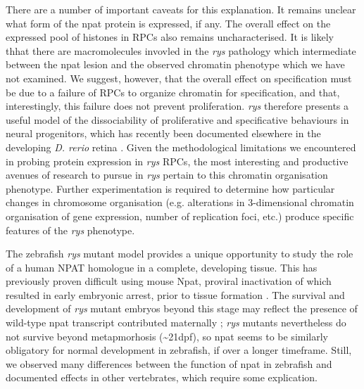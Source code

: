 \documentclass{ut-thesis}
\begin{document}
\begin{NoHyper}
There are a number of important caveats for this explanation. It remains unclear what form of the npat protein is expressed, if any. The overall effect on the expressed pool of histones in RPCs also remains uncharacterised. It is likely thhat there are macromolecules invovled in the \textit{rys} pathology which intermediate between the npat lesion and the observed chromatin phenotype which we have not examined. We suggest, however, that the overall effect on specification must be due to a failure of RPCs to organize chromatin for specification, and that, interestingly, this failure does not prevent proliferation. \textit{rys} therefore presents a useful model of the dissociability of proliferative and specificative behaviours in neural progenitors, which has recently been documented elsewhere in the developing \textit{D. rerio} retina \cite{Engerer2017}. Given the methodological limitations we encountered in probing protein expression in \textit{rys} RPCs, the most interesting and productive avenues of research to pursue in \textit{rys} pertain to this chromatin organisation phenotype.  Further experimentation is required to determine how particular changes in chromosome organisation (e.g. alterations in 3-dimensional chromatin organisation of gene expression, number of replication foci, etc.) produce specific features of the \textit{rys} phenotype. 

The zebrafish \textit{rys} mutant model provides a unique opportunity to study the role of a human NPAT homologue in a complete, developing tissue. This has previously proven difficult using mouse Npat, proviral inactivation of which resulted in early embryonic arrest, prior to tissue formation \cite{DiFruscio1997}. The survival and development of \textit{rys} mutant embryos beyond this stage may reflect the presence of wild-type npat transcript contributed maternally \cite{Harvey2013}; \textit{rys} mutants nevertheless do not survive beyond metapmorhosis (\textasciitilde{}21dpf), so npat seems to be similarly obligatory for normal development in zebrafish, if over a longer timeframe. Still, we observed many differences between the function of npat in zebrafish and documented effects in other vertebrates, which require some explication.


\end{NoHyper}
\end{document}
